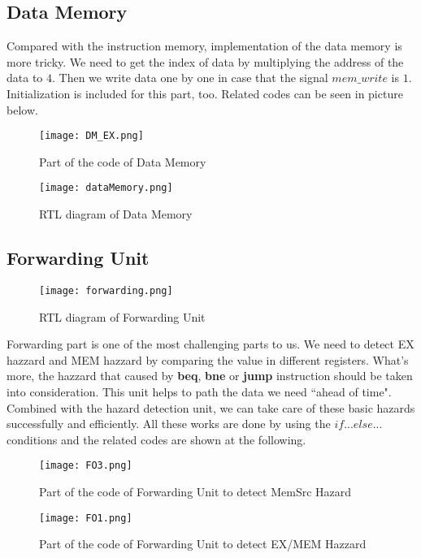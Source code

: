 \documentclass{article}[12pt]
\begin{document}
		\subsection{Data Memory}
		Compared with the instruction memory, implementation of the data memory is more tricky. We need to get the index of data by multiplying the address of the data to $4$. Then we write data one by one in case that the signal $mem\_write$ is $1$. Initialization is included for this part, too. Related codes can be seen in picture below.
		\begin{figure}[H]
			\centering
			\texttt{[image: DM\_EX.png]}
			\caption{Part of the code of Data Memory}
		\end{figure}
		\begin{figure}[H]
				\centering
				\texttt{[image: dataMemory.png]}
				\caption{RTL diagram of Data Memory}
			\end{figure}
		
		\subsection{Forwarding Unit}
			\begin{figure}[H]
				\centering
				\texttt{[image: forwarding.png]}
				\caption{RTL diagram of Forwarding Unit}
			\end{figure}
		Forwarding part is one of the most challenging parts to us. We need to detect EX hazzard and MEM hazzard by comparing the value in different registers. What's more, the hazzard that caused by \textbf{beq}, \textbf{bne} or \textbf{jump} instruction should be taken into consideration. This unit helps to path the data we need ``ahead of time". Combined with the hazard detection unit, we can take care of these basic hazards successfully and efficiently. All these works are done by using the $if...else...$ conditions and the related codes are shown at the following.

		\begin{figure}[H]
			\centering
			\texttt{[image: FO3.png]}
			\caption{Part of the code of Forwarding Unit to detect MemSrc Hazard}
		\end{figure}

		\begin{figure}[H]
			\centering
			\texttt{[image: FO1.png]}
			\caption{Part of the code of Forwarding Unit to detect EX/MEM Hazzard}
		\end{figure}
		
\end{document}
